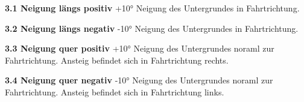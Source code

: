   \begin{description}
    \item \textbf{3.1 Neigung längs positiv} +10° Neigung des Untergrundes in Fahrtrichtung.
    \item \textbf{3.2 Neigung längs negativ} -10° Neigung des Untergrundes in Fahrtrichtung.
    \item \textbf{3.3 Neigung quer positiv} +10° Neigung des Untergrundes noraml zur Fahrtrichtung. Ansteig befindet sich in Fahrtrichtung rechts.
    \item \textbf{3.4 Neigung quer negativ} -10° Neigung des Untergrundes noraml zur Fahrtrichtung. Ansteig befindet sich in Fahrtrichtung links.
  \end{description}


